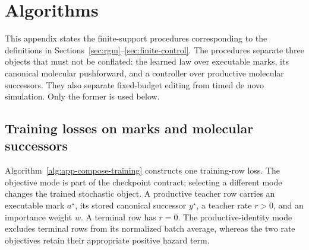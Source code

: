 \newenvironment{composeappendixalgorithm}[1]{%
  \refstepcounter{composeappendixalgorithm}%
  \par\medskip\noindent
  \begin{minipage}{\linewidth}
  \hrule\vspace{0.28em}
  \textbf{Algorithm \thecomposeappendixalgorithm}\quad #1\par
  \vspace{0.22em}\hrule\vspace{0.38em}
}{%
  \vspace{0.18em}\hrule
  \end{minipage}
  \par\medskip
}

\newtheorem{composeappendixproposition}{Proposition}[section]
\newtheorem{composeappendixlemma}[composeappendixproposition]{Lemma}

\section{Algorithms}
\label{sec:app-compose-algorithms}

This appendix states the finite-support procedures corresponding to the
definitions in Sections~\ref{sec:rgm}--\ref{sec:finite-control}.  The
procedures separate three objects that must not be conflated: the learned law
over executable marks, its canonical molecular pushforward, and a controller
over productive molecular successors.  They also separate fixed-budget
editing from timed de novo simulation.  Only the former is used below.

\subsection{Training losses on marks and molecular successors}
\label{sec:app-compose-training}

Algorithm~\ref{alg:app-compose-training} constructs one training-row loss.
The objective mode is part of the checkpoint contract; selecting a different
mode changes the trained stochastic object.  A productive teacher row carries
an executable mark $a^\star$, its stored canonical successor $y^\star$, a
teacher rate $r>0$, and an importance weight $w$.  A terminal row has $r=0$.
The productive-identity mode excludes terminal rows from its normalized batch
average, whereas the two rate objectives retain their appropriate positive
hazard term.


